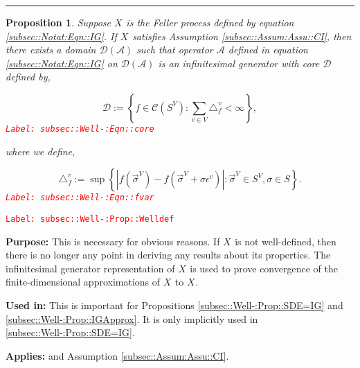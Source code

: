 \documentclass[12pt]{article}
\newcommand{\mc}{\mathcal}
\newcommand{\ep}{\epsilon}
\newcommand{\tr}{\textcolor{red}}
\newcommand{\labe}[1]{\tr{\texttt{Label: #1}}}
\newcommand{\purpose}{\textbf{Purpose: }}
\newcommand{\usein}{\textbf{Used in: }}
\newcommand{\app}{\textbf{Applies: }}
\newcommand{\defeq}{:=}								%
\renewcommand{\v}{v}							%
\renewcommand{\S}{S}							%
\newcommand{\s}{\sigma}							%
\newcommand{\sv}{\vec{\s}}						%
\newcommand{\ev}{\ep}							%
\newcommand{\X}{X}								%
\newcommand{\IG}{\mc{A}}						%
\newcommand{\f}{f}								%
\newcommand{\vind}[1]{^{#1}}					%
\newcommand{\carp}[1]{^{#1}}					%
\newcommand{\vsi}[1]{^{#1}}						%
\newcommand{\cind}[1]{_{#1}}					%
\newcommand{\tip}[1]{#1}						%
\newcommand{\core}{\mc{D}}						%
\newcommand{\cont}{\mc{C}}						%
\newcommand{\delt}{\triangle}					%
\newcommand{\deltf}[1]{_{#1}}					%
\newtheorem{prop}[thms]{Proposition}
\begin{document}
\rule{\linewidth}{0.4 pt}

\begin{prop}
Suppose \(\X\cind{}\tip{}\) is the Feller process defined by equation \eqref{subsec::Notat:Eqn::IG}. If \(\X\cind{}\tip{}\) satisfies Assumption \ref{subsec::Assum:Assu::CI}, then there exists a domain \(\core(\IG)\) such that operator \(\IG\) defined in equation \eqref{subsec::Notat:Eqn::IG} on \(\mc{D}(\IG)\) is an infinitesimal generator with core \(\core\) defined by,

\begin{equation}
\core \defeq \left\{f \in \cont(\S\carp{V}): \sum_{\v\in V} \delt\deltf{\f}\vind{\v} < \infty\right\},
\label{subsec::Well-:Eqn::core}
\end{equation}
\labe{subsec::Well-:Eqn::core}

where we define,

\begin{equation}
\delt\deltf{\f}\vind{\v} \defeq \sup\left\{|f(\sv\cind{}\vsi{V}) - f(\sv\cind{}\vsi{V}+\s\ev\vind{\v})|: \sv\cind{}\vsi{V} \in \S\carp{V},\s \in \S\right\}.
\label{subsec::Well-:Eqn::fvar}
\end{equation}
\labe{subsec::Well-:Eqn::fvar}

\label{subsec::Well-:Prop::Welldef}
\end{prop}
\labe{subsec::Well-:Prop::Welldef}

\purpose This is necessary for obvious reasons. If \(\X\cind{}\tip{}\) is not well-defined, then there is no longer any point in deriving any results about its properties. The infinitesimal generator representation of \(\X\cind{}\tip{}\) is used to prove convergence of the finite-dimensional approximations of \(\X\cind{}\tip{}\) to \(\X\cind{}\tip{}\).

\usein This is important for Propositions \ref{subsec::Well-:Prop::SDE=IG} and \ref{subsec::Well-:Prop::IGApprox}. It is only implicitly used in \ref{subsec::Well-:Prop::SDE=IG}.

\app \cite[Theorem 3.9]{Lig85} and Assumption \ref{subsec::Assum:Assu::CI}.
\end{document}
